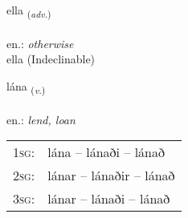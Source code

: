\documentclass[frontgrid, backgrid]{flacards}\usepackage[]{graphicx}\usepackage[]{xcolor}
\begin{document}

\renewcommand{\flhead}{\vskip5pt \fboxsep=0pt {\small\bfseries\footnotesize Atviksorð | Adverb}}
\renewcommand{\fcfoot}{\vskip5pt \fboxsep=0pt \hspace{2pt}{\small\bfseries\footnotesize 2K}}

\renewcommand{\blhead}{\vskip5pt {\small\bfseries\footnotesize Atviksorð | Adverb }}
\renewcommand{\bcfoot}{\vskip5pt \hspace{2pt}{\small\bfseries\footnotesize 2K}}


{ella \small{\textsubscript{(\textit{adv.})}} \\[1ex]
\textphonetic{[ɛtla]} \\
en.: \emph{otherwise} \\  [2ex]
ella (Indeclinable)}

\renewcommand{\flhead}{\vskip5pt \fboxsep=0pt {\small\bfseries\footnotesize Sagnorð | Verb}}
\renewcommand{\fcfoot}{\vskip5pt \fboxsep=0pt \hspace{2pt}{\small\bfseries\footnotesize 2K}}

\renewcommand{\blhead}{\vskip5pt {\small\bfseries\footnotesize Sagnorð | Verb }}
\renewcommand{\bcfoot}{\vskip5pt \hspace{2pt}{\small\bfseries\footnotesize 2K}}


{lána \small{\textsubscript{(\textit{v.})}} \\[1ex] %
\textphonetic{[lauːna]} \\
en.: \emph{lend, loan} \\  [2ex]
\renewcommand*{\arraystretch}{0.8}
\begin{tabular}{p{1cm}l}
\textsc{1sg}: & lána -- lánaði -- lánað \\ 
\textsc{2sg}: & lánar -- lánaðir -- lánað \\ 
\textsc{3sg}: & lánar -- lánaði -- lánað \\ 
\end{tabular}
}

\renewcommand{\flhead}{\vskip5pt \fboxsep=0pt {\small\bfseries\footnotesize Sagnorð | Verb}}
\renewcommand{\fcfoot}{\vskip5pt \fboxsep=0pt \hspace{2pt}{\small\bfseries\footnotesize 2K}}
\end{document}
